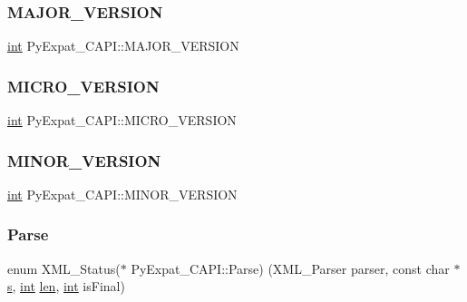 \mbox{\label{struct_py_expat___c_a_p_i_a584f37c57c8604474f31abda36f06055}} 
\subsubsection{\texorpdfstring{MAJOR\_VERSION}{MAJOR\_VERSION}}
{\footnotesize\ttfamily \mbox{\hyperlink{warnings_8h_a74f207b5aa4ba51c3a2ad59b219a423b}{int}} Py\+Expat\+\_\+\+C\+A\+P\+I\+::\+M\+A\+J\+O\+R\+\_\+\+V\+E\+R\+S\+I\+ON}

\mbox{\label{struct_py_expat___c_a_p_i_abd706f536a4b44a93c5207a7e568ce9a}} 
\subsubsection{\texorpdfstring{MICRO\_VERSION}{MICRO\_VERSION}}
{\footnotesize\ttfamily \mbox{\hyperlink{warnings_8h_a74f207b5aa4ba51c3a2ad59b219a423b}{int}} Py\+Expat\+\_\+\+C\+A\+P\+I\+::\+M\+I\+C\+R\+O\+\_\+\+V\+E\+R\+S\+I\+ON}

\mbox{\label{struct_py_expat___c_a_p_i_a4254d96093f733cbed41fded6308b334}} 
\subsubsection{\texorpdfstring{MINOR\_VERSION}{MINOR\_VERSION}}
{\footnotesize\ttfamily \mbox{\hyperlink{warnings_8h_a74f207b5aa4ba51c3a2ad59b219a423b}{int}} Py\+Expat\+\_\+\+C\+A\+P\+I\+::\+M\+I\+N\+O\+R\+\_\+\+V\+E\+R\+S\+I\+ON}

\mbox{\label{struct_py_expat___c_a_p_i_a7d1e36f41cf7327ea479886dadb31321}} 
\subsubsection{\texorpdfstring{Parse}{Parse}}
{\footnotesize\ttfamily enum X\+M\+L\+\_\+\+Status($\ast$ Py\+Expat\+\_\+\+C\+A\+P\+I\+::\+Parse) (X\+M\+L\+\_\+\+Parser parser, const char $\ast$\mbox{\hyperlink{_s_d_l__opengl_8h_a4af680a6c683f88ed67b76f207f2e6e4}{s}}, \mbox{\hyperlink{warnings_8h_a74f207b5aa4ba51c3a2ad59b219a423b}{int}} \mbox{\hyperlink{_s_d_l__opengl__glext_8h_a652168017ea9a8bbcead03d5c16269fb}{len}}, \mbox{\hyperlink{warnings_8h_a74f207b5aa4ba51c3a2ad59b219a423b}{int}} is\+Final)}

